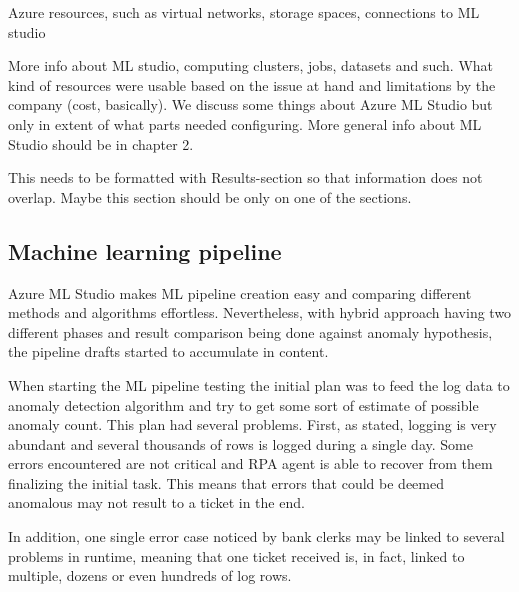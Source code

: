 \begin{itcomment}
    Azure resources, such as virtual networks, storage spaces, connections to ML studio \etc

    More info about ML studio,
    computing clusters, jobs, datasets and such.
    What kind of resources were usable based on the issue at hand
    and limitations by the company (cost, basically).
    We discuss some things about Azure ML Studio
    but only in extent of what parts needed configuring.
    More general info about ML Studio should be in chapter 2.

    This needs to be formatted with Results-section
    so that information does not overlap.
    Maybe this section should be only on one of the sections.
\end{itcomment}





\subsection{Machine learning pipeline}\label{subsec:meth-ml-pipeline}

Azure ML Studio makes ML pipeline creation easy
and comparing different methods and algorithms effortless.
Nevertheless,
with hybrid approach having two different phases
and result comparison being done against anomaly hypothesis,
the pipeline drafts started to accumulate in content.

When starting the ML pipeline testing
the initial plan was to feed the log data to anomaly detection algorithm
and try to get some sort of estimate of possible anomaly count.
This plan had several problems.
First, as stated, logging is very abundant
and several thousands of rows is logged
during a single day.
Some errors encountered are not critical
and RPA agent is able to recover from them
finalizing the initial task.
This means that errors that could be deemed anomalous
may not result to a ticket in the end.

In addition,
one single error case noticed by bank clerks
may be linked to several problems in runtime,
meaning that one ticket received is,
in fact, linked to multiple, dozens or
even hundreds of log rows.


